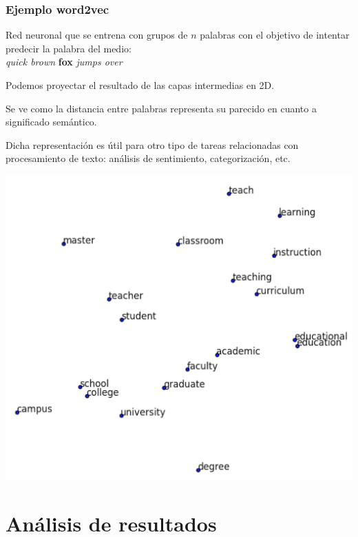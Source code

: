 \documentclass{beamer}
\newenvironment{wideitemize}{\itemize\addtolength{\itemsep}{12pt}}{\enditemize}
\begin{document}
\begin{frame}
\frametitle{Ejemplo word2vec}
\begin{wideitemize}
\item Red neuronal que se entrena con grupos de $n$ palabras con el objetivo de intentar predecir la palabra del medio: \\ \textit{quick brown} \textbf{fox} \textit{jumps over}
\item Podemos proyectar el resultado de las capas intermedias en 2D.

\item Se ve como la distancia entre palabras representa su parecido en cuanto a significado semántico.

\item Dicha representación es útil para otro tipo de tareas relacionadas con procesamiento de texto: análisis de sentimiento, categorización, etc.
\end{wideitemize}
\end{frame}

\begin{frame}[plain]
\centering
\includegraphics[scale=0.4]{word2vec.png}
\end{frame}


\section{Análisis de resultados}
\end{document}
